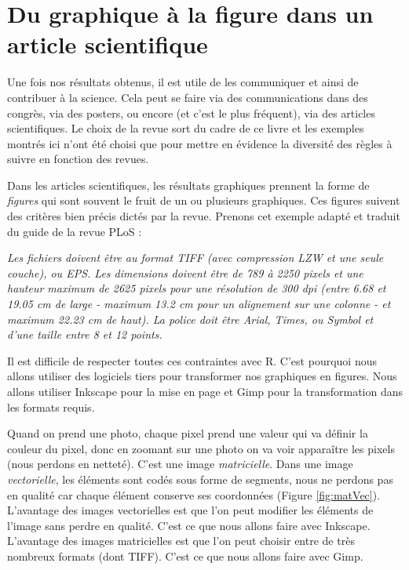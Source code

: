 \documentclass[
]{book}
\begin{document}
\hypertarget{graph4}{%
\chapter{Du graphique à la figure dans un article scientifique}\label{graph4}}

Une fois nos résultats obtenus, il est utile de les communiquer et ainsi de contribuer à la science. Cela peut se faire via des communications dans des congrès, via des posters, ou encore (et c'est le plus fréquent), via des articles scientifiques. Le choix de la revue sort du cadre de ce livre et les exemples montrés ici n'ont été choisi que pour mettre en évidence la diversité des règles à suivre en fonction des revues.

Dans les articles scientifiques, les résultats graphiques prennent la forme de \emph{figures} qui sont souvent le fruit de un ou plusieurs graphiques. Ces figures suivent des critères bien précis dictés par la revue. Prenons cet exemple adapté et traduit du guide de la revue PLoS :

\emph{Les fichiers doivent être au format TIFF (avec compression LZW et une seule couche), ou EPS. Les dimensions doivent être de 789 à 2250 pixels et une hauteur maximum de 2625 pixels pour une résolution de 300 dpi (entre 6.68 et 19.05 cm de large - maximum 13.2 cm pour un alignement sur une colonne - et maximum 22.23 cm de haut). La police doit être Arial, Times, ou Symbol et d'une taille entre 8 et 12 points.}

Il est difficile de respecter toutes ces contraintes avec R. C'est pourquoi nous allons utiliser des logiciels tiers pour transformer nos graphiques en figures. Nous allons utiliser Inkscape pour la mise en page et Gimp pour la transformation dans les formats requis.

Quand on prend une photo, chaque pixel prend une valeur qui va définir la couleur du pixel, donc en zoomant sur une photo on va voir apparaître les pixels (nous perdons en netteté). C'est une image \emph{matricielle}. Dans une image \emph{vectorielle}, les éléments sont codés sous forme de segments, nous ne perdons pas en qualité car chaque élément conserve ses coordonnées (Figure \ref{fig:matVec}). L'avantage des images vectorielles est que l'on peut modifier les éléments de l'image sans perdre en qualité. C'est ce que nous allons faire avec Inkscape. L'avantage des images matricielles est que l'on peut choisir entre de très nombreux formats (dont TIFF). C'est ce que nous allons faire avec Gimp.
\end{document}

